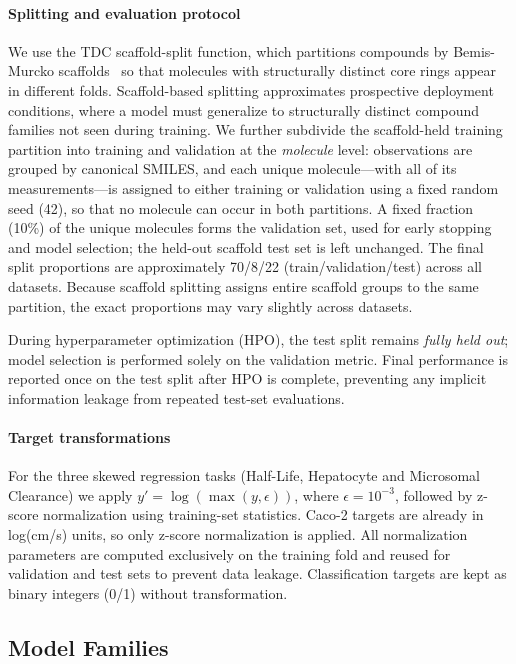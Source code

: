 \documentclass[journal]{IEEEtran}
\begin{document}
\paragraph{Splitting and evaluation protocol}
We use the TDC scaffold-split function, which partitions compounds by Bemis-Murcko scaffolds~\cite{doi:10.1021/jm9602928} so that molecules with structurally distinct core rings appear in different folds. Scaffold-based splitting approximates prospective deployment conditions, where a model must generalize to structurally distinct compound families not seen during training. We further subdivide the scaffold-held training partition into training and validation at the \emph{molecule} level: observations are grouped by canonical SMILES, and each unique molecule---with all of its measurements---is assigned to either training or validation using a fixed random seed (42), so that no molecule can occur in both partitions. A fixed fraction (10\%) of the unique molecules forms the validation set, used for early stopping and model selection; the held-out scaffold test set is left unchanged. The final split proportions are approximately 70/8/22 (train/validation/test) across all datasets.
Because scaffold splitting assigns entire scaffold groups to the same partition, the exact proportions may vary slightly across datasets.

During hyperparameter optimization (HPO), the test split remains \emph{fully held out}; model selection is performed solely on the validation metric. Final performance is reported once on the test split after HPO is complete, preventing any implicit information leakage from repeated test-set evaluations.

\paragraph{Target transformations}
For the three skewed regression tasks (Half-Life, Hepatocyte and Microsomal Clearance) we apply $y' = \log(\max(y, \epsilon))$, where $\epsilon = 10^{-3}$, followed by z-score normalization using training-set statistics. Caco-2 targets are already in log(cm/s) units, so only z-score normalization is applied. All normalization parameters are computed exclusively on the training fold and reused for validation and test sets to prevent data leakage. Classification targets are kept as binary integers (0/1) without transformation.

\subsection{Model Families}
\label{sec:model_families}
\end{document}
